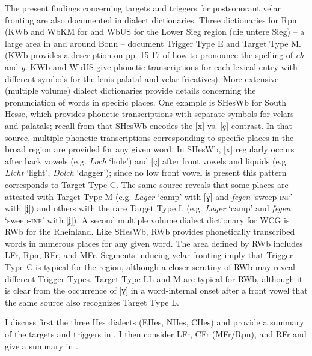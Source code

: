 The present findings concerning targets and triggers for postsonorant velar fronting are also documented in dialect dictionaries. Three dictionaries for Rpn (KWb and WbKM for  and WbUS for the Lower Sieg region (die untere Sieg) -- a large area in and around Bonn -- document Trigger Type E and Target Type M. (KWb provides a description on pp. 15-17 of how to pronounce the spelling of \textit{ch} and \textit{g}. KWb and WbUS give phonetic transcriptions for each lexical entry with different symbols for the lenis palatal and velar fricatives). More extensive (multiple volume) dialect dictionaries provide details concerning the pronunciation of words in specific places. One example is SHesWb for South Hesse, which provides phonetic transcriptions with separate symbols for velars and palatals; recall from  that SHesWb encodes the [x] vs. [ç] contrast. In that source, multiple phonetic transcriptions corresponding to specific places in the broad region are provided for any given word. In SHesWb, [x] regularly occurs after back vowels (e.g. \textit{Loch} ‘hole’) and [ç] after front vowels and liquids (e.g. \textit{Licht} ‘light’, \textit{Dolch} ‘dagger’); since no low front vowel is present this pattern corresponds to Target Type C. The same source reveals that some places are attested with Target Type M (e.g. \textit{Lager} ‘camp’ with [ɣ] and \textit{fegen} ‘sweep-\textsc{inf}’ with [ʝ]) and others with the rare Target Type L (e.g. \textit{Lager} ‘camp’ and \textit{fegen} ‘sweep-\textsc{inf}’ with [ʝ]). A second multiple volume dialect dictionary for WCG is RWb for the Rheinland. Like SHesWb, RWb provides phonetically transcribed words in numerous places for any given word. The area defined by RWb includes LFr, Rpn, RFr, and MFr. Segments inducing velar fronting imply that Trigger Type C is typical for the region, although a closer scrutiny of RWb may reveal different Trigger Types. Target Type LL and M are typical for RWb, although it is clear from the occurrence of [ɣ] in a word-internal onset after a front vowel that the same source also recognizes Target Type L.

I discuss first the three Hes dialects (EHes, NHes, CHes) and provide a summary of the targets and triggers in . I then consider LFr, CFr (MFr/Rpn), and RFr and give a summary in .

